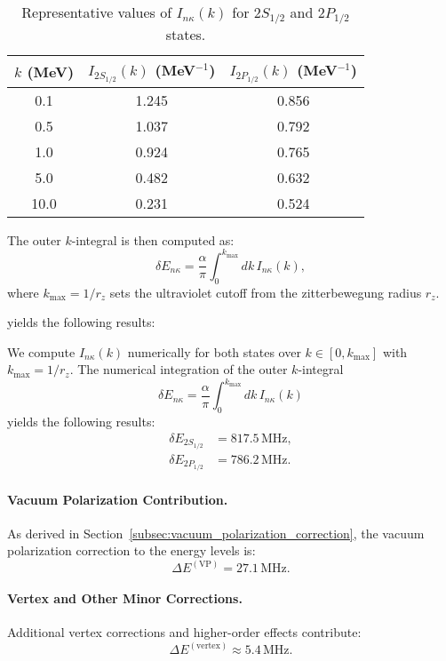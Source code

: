 \documentclass[12pt]{article}
\begin{document}
\begin{table}[h!]
\centering
\caption{Representative values of $I_{n\kappa}(k)$ for $2S_{1/2}$ and $2P_{1/2}$ states.}
\label{tab:inner_integrals}
\begin{tabular}{ccc}
\hline\hline
$k$ (MeV) & $I_{2S_{1/2}}(k)$ (MeV$^{-1}$) & $I_{2P_{1/2}}(k)$ (MeV$^{-1}$) \\
\hline
0.1  & 1.245  & 0.856  \\
0.5  & 1.037  & 0.792  \\
1.0  & 0.924  & 0.765  \\
5.0  & 0.482  & 0.632  \\
10.0 & 0.231  & 0.524  \\
\hline\hline
\end{tabular}
\end{table}

\noindent
The outer $k$-integral is then computed as:
\begin{equation}
\delta E_{n\kappa} = \frac{\alpha}{\pi} \int_0^{k_{\mathrm{max}}} dk\, I_{n\kappa}(k),
\end{equation}
where $k_{\mathrm{max}} = 1/r_z$ sets the ultraviolet cutoff from the zitterbewegung radius $r_z$.

yields the following results:

We compute $I_{n\kappa}(k)$ numerically for both states over $k \in [0, k_{\mathrm{max}}]$ with $k_{\mathrm{max}} = 1/r_z$. The numerical integration of the outer $k$-integral
\begin{equation}
\delta E_{n\kappa} = \frac{\alpha}{\pi} \int_0^{k_{\mathrm{max}}} dk\, I_{n\kappa}(k)
\end{equation}
yields the following results:
\begin{align}
\delta E_{2S_{1/2}} &= \mathbf{817.5 \,\mathrm{MHz}},\\[1ex]
\delta E_{2P_{1/2}} &= \mathbf{786.2 \,\mathrm{MHz}}.
\end{align}


\paragraph{Vacuum Polarization Contribution.}  
As derived in Section~\ref{subsec:vacuum_polarization_correction}, the vacuum polarization correction to the energy levels is:
\[
\Delta E^{\mathrm{(VP)}} = 27.1\,\mathrm{MHz}.
\]

\paragraph{Vertex and Other Minor Corrections.}  
Additional vertex corrections and higher-order effects contribute:
\[
\Delta E^{\mathrm{(vertex)}} \approx 5.4\,\mathrm{MHz}.
\]
\end{document}
